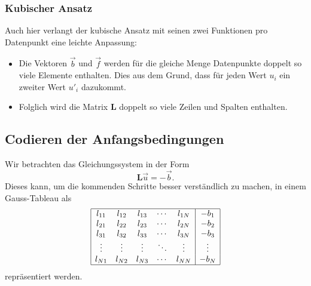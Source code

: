 \subsubsection{Kubischer Ansatz}
Auch hier verlangt der kubische Ansatz mit seinen zwei Funktionen pro Datenpunkt eine leichte Anpassung: 
\begin{itemize}
    \item Die Vektoren $\vec{b}$ und $\vec{f}$ werden für die gleiche Menge Datenpunkte doppelt so viele Elemente enthalten.
          Dies aus dem Grund, dass für jeden Wert $u_i$ ein zweiter Wert $u'_i$ dazukommt.
    \item Folglich wird die Matrix $\mathbf{L}$ doppelt so viele Zeilen und Spalten enthalten. 
\end{itemize}


\subsection{Codieren der Anfangsbedingungen\label{fem:1d:anfangsbedingungen}}
Wir betrachten das Gleichungssystem in der Form 
\begin{equation}
    \mathbf{L}\vec{u} = -\vec{b}. 
    \label{fem:1d:gleichungssystem}
\end{equation}
Dieses kann, um die kommenden Schritte besser verständlich zu machen, in einem Gauss-Tableau als
\begin{equation}
    \begin{array}{|ccccc|c|}
        \hline
        l_{11} & l_{12} & l_{13} & \cdots & l_{1N} & -b_1   \\
        l_{21} & l_{22} & l_{23} & \cdots & l_{2N} & -b_2   \\
        l_{31} & l_{32} & l_{33} & \cdots & l_{3N} & -b_3   \\
        \vdots & \vdots & \vdots & \ddots & \vdots & \vdots \\
        l_{N1} & l_{N2} & l_{N3} & \cdots & l_{NN} & -b_N   \\
        \hline
    \end{array}
\end{equation}
repräsentiert werden.

